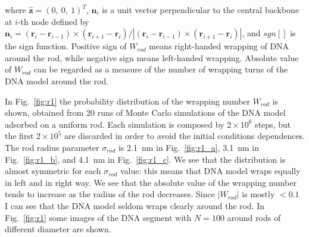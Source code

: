\documentclass[a4paper,10pt]{article}
\begin{document}
where $\hat{\textbf{z}}=\left (0,\ 0,\ 1\right )^T$, $\textbf{n}_i$ is a unit vector perpendicular to the central backbone at $i$-th node defined by  $\textbf{n}_i=\left (\textbf{r}_{i}-\textbf{r}_{i-1}\right )\times\left (\textbf{r}_{i+1}-\textbf{r}_{i}\right )/\left |\left (\textbf{r}_{i}-\textbf{r}_{i-1}\right )\times\left (\textbf{r}_{i+1}-\textbf{r}_{i}\right )\right |$, and $sgn\left [\right ]$ is the sign function.
Positive sign of $W_{rod}$ means right-handed wrapping of DNA around the rod, while negative sign means left-handed wrapping.
Absolute value of $W_{rod}$ can be regarded as a measure of the number of wrapping turns of the DNA model around the rod.

In Fig.~\ref{fig:r1} the probability distribution of the wrapping number $W_{rod}$ is shown, obtained from $20$ runs of Monte Carlo simulations of the DNA model adsorbed on a uniform rod.
Each simulation is composed by $2\times 10^6$ steps, but the first $2\times 10^5$ are discarded in order to avoid the initial conditions dependences.
The rod radius parameter $\sigma_{rod}$ is \SI{2.1}{\nm} in Fig.~\ref{fig:r1_a}, \SI{3.1}{\nm} in Fig.~\ref{fig:r1_b}, and \SI{4.1}{\nm} in Fig.~\ref{fig:r1_c}.
We see that the distribution is almost symmetric for each $\sigma_{rod}$ value: this means that DNA model wraps equally in left and in right way.
We see that the absolute value of the wrapping number tends to increase as the radius of the rod decreases.
Since $\left |W_{rod}\right |$ is mostly $<0.1$ I can see that the DNA model seldom wraps clearly around the rod.
In Fig.~\ref{fig:r1} some images of the DNA segment with $N=100$ around rods of different diameter are shown.
\end{document}
